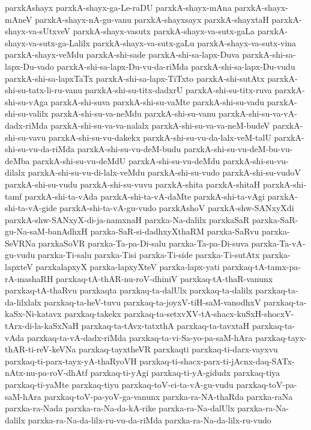 {parxkAshayx
parxkA-shayx-ga-Le-raDU
parxkA-shayx-mAna
parxkA-shayx-mAneV
parxkA-shayx-nA-gu-vanu
parxkA-shayxsayx
parxkA-shayxtaH
parxkA-shayx-va-sUtxveV
parxkA-shayx-vasutx
parxkA-shayx-va-sutx-gaLa
parxkA-shayx-va-sutx-ga-Lalilx
parxkA-shayx-va-sutx-gaLu
parxkA-shayx-va-sutx-vina
parxkA-shayx-veMdu
parxkA-shi-sade
parxkA-shi-sa-lapx-Duva
parxkA-shi-sa-lapx-Du-vado
parxkA-shi-sa-lapx-Du-vu-da-riMda
parxkA-shi-sa-lapx-Du-vudu
parxkA-shi-sa-lapxTaTx
parxkA-shi-sa-lapx-TiTxto
parxkA-shi-sutAtx
parxkA-shi-su-tatx-li-ru-vanu
parxkA-shi-su-titx-dadxrU
parxkA-shi-su-titx-ruva
parxkA-shi-su-vAga
parxkA-shi-suva
parxkA-shi-su-vaMte
parxkA-shi-su-vadu
parxkA-shi-su-valilx
parxkA-shi-su-va-neMdu
parxkA-shi-su-vanu
parxkA-shi-su-va-vA-dadx-riMda
parxkA-shi-su-va-va-nalalx
parxkA-shi-su-va-va-neM-budeV
parxkA-shi-su-vavu
parxkA-shi-su-vu-dakekx
parxkA-shi-su-vu-da-lalx-veM-talU
parxkA-shi-su-vu-da-riMda
parxkA-shi-su-vu-deM-budu
parxkA-shi-su-vu-deM-bu-vu-deMba
parxkA-shi-su-vu-deMdU
parxkA-shi-su-vu-deMdu
parxkA-shi-su-vu-dilalx
parxkA-shi-su-vu-di-lalx-veMdu
parxkA-shi-su-vudo
parxkA-shi-su-vudoV
parxkA-shi-su-vudu
parxkA-shi-su-vuvu
parxkA-shita
parxkA-shitaH
parxkA-shi-tamf
parxkA-shi-ta-vAda
parxkA-shi-ta-vA-daMte
parxkA-shi-ta-vAgi
parxkA-shi-ta-vA-gide
parxkA-shi-ta-vA-gu-vudo
parxkAshoV
parxkA-shw-SANxyXdi
parxkA-shw-SANxyX-di-ja-namxnaH
parxka-Na-dalilx
parxkaSaR
parxka-SaR-gu-Na-saM-banAdhxH
parxka-SaR-si-dadhxyXthaRM
parxka-SaRvu
parxka-SeVRNa
parxkaSoVR
parxka-Ta-pa-Di-salu
parxka-Ta-pa-Di-suva
parxka-Ta-vA-gu-vudu
parxka-Ti-salu
parxka-Tisi
parxka-Ti-side
parxka-Ti-sutAtx
parxka-lapxteV
parxkalapxyX
parxka-lapxyXteV
parxka-lapx-yati
parxkaq-tA-tamx-pa-rA-mashaRH
parxkaq-tA-thAR-nu-roV-dhiniV
parxkaq-tA-thaR-vanunx
parxkaq-tA-thaRvu
parxkaqta
parxkaq-ta-dalUlx
parxkaq-ta-dalilx
parxkaq-ta-da-lilxlalx
parxkaq-ta-heV-tuvu
parxkaq-ta-joyxV-tiH-saM-vanodhxV
parxkaq-ta-kaSx-Ni-katavx
parxkaq-takekx
parxkaq-ta-setxvXV-tA-shacx-kuSxH-shocxV-tArx-di-la-kaSxNaH
parxkaq-ta-tAvx-tatxthA
parxkaq-ta-tavxtaH
parxkaq-ta-vAda
parxkaq-ta-vA-dadx-riMda
parxkaq-ta-vi-Sa-yo-pa-saM-hAra
parxkaq-tayx-thAR-ti-reV-keVNa
parxkaq-tayxtheVR
parxkaqti
parxkaq-ti-darx-vayxvu
parxkaq-ti-parx-tayx-yA-thaRyoVH
parxkaq-ti-shacx-parx-ti-jAcnx-daq-SATx-nAtx-nu-pa-roV-dhAtf
parxkaq-ti-yAgi
parxkaq-ti-yA-gidudx
parxkaq-tiya
parxkaq-ti-yaMte
parxkaq-tiyu
parxkaq-toV-ci-ta-vA-gu-vudu
parxkaq-toV-pa-saM-hAra
parxkaq-toV-pa-yoV-ga-vanunx
parxka-ra-NA-thaRda
parxka-raNa
parxka-ra-Nada
parxka-ra-Na-da-kA-rike
parxka-ra-Na-dalUlx
parxka-ra-Na-dalilx
parxka-ra-Na-da-lilx-ru-vu-da-riMda
parxka-ra-Na-da-lilx-ru-vudo
}
